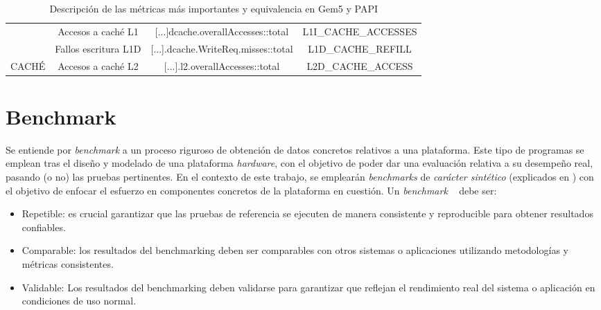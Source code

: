\begin{table}[H]
\begin{tabular}{|cccc|}
\multicolumn{1}{|c|}{\cellcolor[HTML]{EFEFEF}}                        & \multicolumn{1}{c|}{\multirow{-2}{*}{Accesos a caché L1}}         & \multicolumn{1}{c|}{\multirow{-2}{*}{{[}...{]}dcache.overallAccesses::total}} & L1I\_CACHE\_ACCESSES                    \\ \cline{2-4} 
\multicolumn{1}{|c|}{\cellcolor[HTML]{EFEFEF}}                        & \multicolumn{1}{c|}{Fallos escritura L1D}                      & \multicolumn{1}{c|}{{[}...{]}.dcache.WriteReq.misses::total}                  & L1D\_CACHE\_REFILL                      \\ \cline{2-4} 
\multicolumn{1}{|c|}{\multirow{-4}{*}{\cellcolor[HTML]{EFEFEF}CACHÉ}} & \multicolumn{1}{c|}{Accesos a caché L2}                           & \multicolumn{1}{c|}{{[}...{]}.l2.overallAccesses::total}                      & L2D\_CACHE\_ACCESS                      \\ \hline
\end{tabular}
\caption{Descripción de las métricas más importantes y equivalencia en Gem5 y PAPI}
\label{tab:eventosDescPapiGem5}
\end{table}

\section{Benchmark}
\label{sec:benchmark}
Se entiende por \textit{benchmark} a un proceso riguroso de obtención de datos concretos relativos a una plataforma. Este tipo de programas se emplean tras el diseño y modelado de una plataforma \textit{hardware}, con el objetivo de poder dar una evaluación relativa a su desempeño real, pasando (o no) las pruebas pertinentes. En el contexto de este trabajo, se emplearán \textit{benchmarks} de \emph{carácter sintético} (explicados en \label{sec:tipos-benchmark}) con el objetivo de enfocar el esfuerzo en componentes concretos de la plataforma en cuestión. Un \textit{benchmark} ~\cite{benchmarking-concepto} debe ser:

\begin{itemize}
  \item Repetible: es crucial garantizar que las pruebas de referencia se ejecuten de manera consistente y reproducible para obtener resultados confiables.
  \item Comparable: los resultados del benchmarking deben ser comparables con otros sistemas o aplicaciones utilizando metodologías y métricas consistentes.
  \item Validable: Los resultados del benchmarking deben validarse para garantizar que reflejan el rendimiento real del sistema o aplicación en condiciones de uso normal.
\end{itemize}

